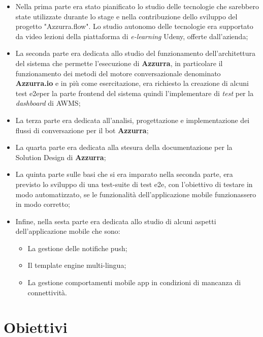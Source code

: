 \begin{itemize}
	\item Nella prima parte era stato pianificato lo studio delle tecnologie che sarebbero state utilizzate durante lo stage e nella contribuzione dello sviluppo del progetto "Azzurra.flow". Lo studio autonomo delle tecnologie era supportato da video lezioni della piattaforma di \emph{e-learning} Udeny, offerte dall'azienda;
	\item La seconda parte era dedicata allo studio del funzionamento dell'architettura del sistema che permette l'esecuzione di \textbf{Azzurra}, in particolare il funzionamento dei metodi del motore conversazionale denominato \textbf{Azzurra.io} e in più come esercitazione, era richiesto la creazione di alcuni \gls{test e2e}\glsfirstoccur per la parte frontend del sistema quindi l'implementare di \emph{test} per la \emph{dashboard} di \gls{AWMS};
	\item La terza parte era dedicata all'analisi, progettazione e implementazione dei flussi di conversazione per il \gls{bot} \textbf{Azzurra};
	\item La quarta parte era dedicata alla stesura della documentazione per la Solution Design di \textbf{Azzurra};
	\item La quinta parte sulle basi che si era imparato nella seconda parte, era previsto lo sviluppo di una test-suite di \gls{test e2e}, con l'obiettivo di testare in modo automatizzato, se le funzionalità dell'applicazione mobile funzionassero in modo corretto;
	\item Infine, nella sesta parte era dedicata allo studio di alcuni aspetti dell'applicazione mobile che sono:
		\begin{itemize}
			\item La gestione delle notifiche push;
			\item Il template engine multi-lingua;
			\item La gestione comportamenti mobile app in condizioni di mancanza di connettività.
		\end{itemize}
\end{itemize}



\section{Obiettivi}


